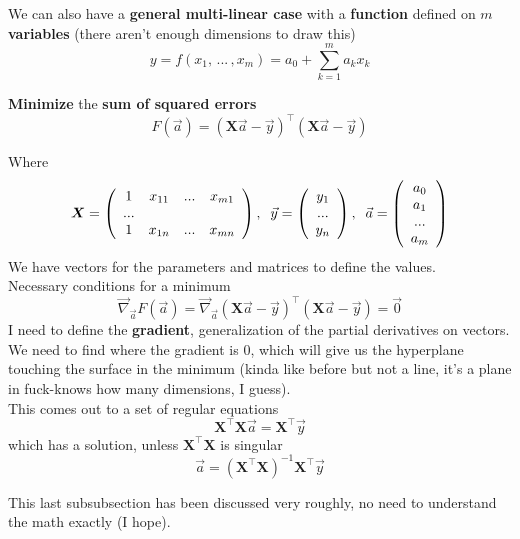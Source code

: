 \documentclass[11pt]{article}
\begin{document}
		\newpage
		
		We can also have a \textbf{general multi-linear case} with a \textbf{function} defined on $m$ \textbf{variables} (there aren't enough dimensions to draw this)
		$$ y = f(x_1, \, ... \, , x_m) = a_0 + \sum_{k=1}^m a_k x_k $$
		
		\textbf{Minimize} the \textbf{sum of squared errors}
		$$ F (\vec{a}) = \left(\bm{X} \vec{a} - \vec{y}\right)^{\top} \left(\bm{X} \vec{a} - \vec{y}\right)$$
		
		Where
		$$ 
		\bm{X} = \left(
		\begin{array}{c c c c}
			1 & x_{11} & ... & x_{m1} \\
			... \\
			1 & x_{1n} & ... & x_{mn}
		\end{array}
		\right), \;\;
		\vec{y} = \left(
		\begin{array}{c}
			y_1 \\
			...\\
			y_n
		\end{array}
		\right), \;\;
		\vec{a} = \left(
		\begin{array}{c}
			a_0\\
			a_1\\
			...\\
			a_m
		\end{array}
		\right)
		$$
		We have vectors for the parameters and matrices to define the values.\\
		
		Necessary conditions for a minimum
		$$ \vec{\nabla}_{\vec{a}} F(\vec{a}) = \vec{\nabla}_{\vec{a}} \left(\bm{X} \vec{a} - \vec{y}\right)^{\top} \left(\bm{X} \vec{a} - \vec{y}\right) = \vec{0} $$
		I need to define the \textbf{gradient}, generalization of the partial derivatives on vectors. We need to find where the gradient is 0, which will give us the hyperplane touching the surface in the minimum (kinda like before but not a line, it's a plane in fuck-knows how many dimensions, I guess).\\
		
		This comes out to a set of regular equations
		$$ \bm{X}^{\top} \bm{X} \vec{a} = \bm{X}^{\top} \vec{y} $$
		which has a solution, unless $\bm{X}^{\top} \bm{X}$ is singular 
		$$ \vec{a} = \left(\bm{X}^{\top} \bm{X}\right)^{-1} \bm{X}^{\top} \vec{y} $$
		
		\vfill 
		
		This last subsubsection has been discussed very roughly, no need to understand the math exactly (I hope).
		
\end{document}
